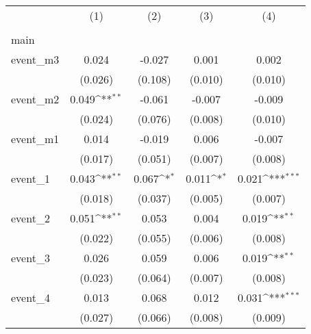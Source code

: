 {
\def\sym#1{\ifmmode^{#1}\else\(^{#1}\)\fi}
\begin{tabular}{l*{4}{c}}
\hline\hline
                    &\multicolumn{1}{c}{(1)}&\multicolumn{1}{c}{(2)}&\multicolumn{1}{c}{(3)}&\multicolumn{1}{c}{(4)}\\
                    &\multicolumn{1}{c}{} &\multicolumn{1}{c}{} &\multicolumn{1}{c}{} &\multicolumn{1}{c}{} \\
\hline
main                &                     &                     &                     &                     \\
event\_m3            &       0.024         &      -0.027         &       0.001         &       0.002         \\
                    &     (0.026)         &     (0.108)         &     (0.010)         &     (0.010)         \\
[1em]
event\_m2            &       0.049\sym{**} &      -0.061         &      -0.007         &      -0.009         \\
                    &     (0.024)         &     (0.076)         &     (0.008)         &     (0.010)         \\
[1em]
event\_m1            &       0.014         &      -0.019         &       0.006         &      -0.007         \\
                    &     (0.017)         &     (0.051)         &     (0.007)         &     (0.008)         \\
[1em]
event\_1             &       0.043\sym{**} &       0.067\sym{*}  &       0.011\sym{*}  &       0.021\sym{***}\\
                    &     (0.018)         &     (0.037)         &     (0.005)         &     (0.007)         \\
[1em]
event\_2             &       0.051\sym{**} &       0.053         &       0.004         &       0.019\sym{**} \\
                    &     (0.022)         &     (0.055)         &     (0.006)         &     (0.008)         \\
[1em]
event\_3             &       0.026         &       0.059         &       0.006         &       0.019\sym{**} \\
                    &     (0.023)         &     (0.064)         &     (0.007)         &     (0.008)         \\
[1em]
event\_4             &       0.013         &       0.068         &       0.012         &       0.031\sym{***}\\
                    &     (0.027)         &     (0.066)         &     (0.008)         &     (0.009)         \\

\end{tabular}}
